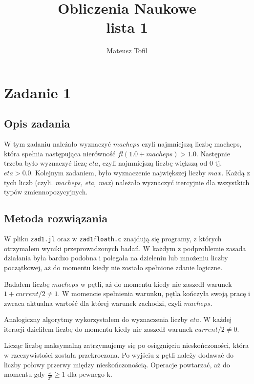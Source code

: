 \documentclass{article}
\begin{document}
\begin{titlepage}
    \title{Obliczenia Naukowe \\ 
    \large lista 1}
    \author{Mateusz Tofil}
    \maketitle
\end{titlepage}

\section{Zadanie 1}

\subsection{Opis zadania}

W tym zadaniu należało wyznaczyć \(macheps\)  czyli najmniejszą liczbę macheps, która spełnia następująca nierówność \( fl(1.0+macheps) > 1.0\). Następnie trzeba było wyznaczyć liczę \(eta\), czyli najmniejszą liczbę większą od 0 tj. \(eta > 0.0\). Kolejnym zadaniem, było wyznaczenie największej liczby \(max\). Każdą z tych liczb (czyli. \emph{macheps, eta, max}) należało wyznaczyć itercyjnie dla wszystkich typów zmiennopozycyjnych.

\subsection{Metoda rozwiązania}

W pliku \texttt{zad1.jl} oraz w \texttt{zad1floath.c} znajdują się programy, z których otrzymałem wyniki przeprowadzonych badań. W każdym z podproblemie zasada działania była bardzo podobna i polegała na dzieleniu lub mnożeniu liczby początkowej, aż do momentu kiedy nie zostało spełnione zdanie logiczne. 

Badałem liczbę \(macheps\) w pętli, aż do momentu kiedy nie zaszedł warunek \(1 + current/2 \neq 1\). W momencie spełnienia warunku, pętla kończyła swoją pracę i zwraca aktualna wartość dla której warunek zachodzi, czyli \(macheps\).

Analogiczny algorytmy wykorzystałem do wyznaczenia liczby \(eta\). W każdej iteracji dzieliłem liczbę do momentu kiedy nie zaszedł warunek \(current/2 \neq 0\).

Licząc liczbę maksymalną zatrzymujemy się po osiągnięciu nieskończoności, która w rzeczywistości została przekroczona. Po wyjściu z pętli należy dodawać do liczby połowy przerwy między nieskończonością. Operacje powtarzać, aż do momentu gdy \(\frac{x}{2^k} \geq1 \) dla pewnego k.
\end{document}
